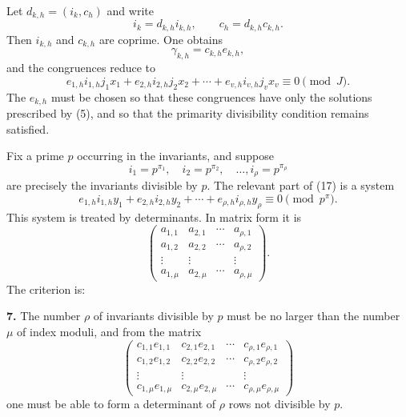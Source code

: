 \documentclass[11pt]{article}
\begin{document}
Let $d_{k,h}=(i_k,c_h)$ and write
\begin{equation}
 i_k=d_{k,h}i_{k,h},\qquad c_h=d_{k,h}c_{k,h}.
\tag{11}
\end{equation}
Then $i_{k,h}$ and $c_{k,h}$ are coprime. One obtains
\begin{equation}
 \gamma_{k,h}=c_{k,h}e_{k,h},
\tag{15}
\end{equation}
and the congruences reduce to
\begin{equation}
 e_{1,h}i_{1,h}j_1x_1+e_{2,h}i_{2,h}j_2x_2+
\cdots+e_{v,h}i_{v,h}j_vx_v\equiv0\pmod J.
\tag{17}
\end{equation}
The $e_{k,h}$ must be chosen so that these congruences have only the solutions prescribed by (5), and so that the primarity divisibility condition remains satisfied.

Fix a prime $p$ occurring in the invariants, and suppose
\begin{equation}
 i_1=p^{\pi_1},\quad i_2=p^{\pi_2},\quad\ldots,
 i_\rho=p^{\pi_\rho}
\tag{18}
\end{equation}
are precisely the invariants divisible by $p$. The relevant part of (17) is a system
\begin{equation}
 e_{1,h}i_{1,h}y_1+e_{2,h}i_{2,h}y_2+
\cdots+e_{\rho,h}i_{\rho,h}y_\rho\equiv0\pmod {p^\pi}.
\tag{20}
\end{equation}
This system is treated by determinants. In matrix form it is
\begin{equation}
\begin{pmatrix}
 a_{1,1}&a_{2,1}&\cdots&a_{\rho,1}\\
 a_{1,2}&a_{2,2}&\cdots&a_{\rho,2}\\
 \vdots&\vdots&&\vdots\\
 a_{1,\mu}&a_{2,\mu}&\cdots&a_{\rho,\mu}
\end{pmatrix}.
\tag{22}
\end{equation}
The criterion is:

\medskip
\noindent\textbf{7.} The number $\rho$ of invariants divisible by $p$ must be no larger than the number $\mu$ of index moduli, and from the matrix
\begin{equation}
\begin{pmatrix}
 c_{1,1}e_{1,1}&c_{2,1}e_{2,1}&\cdots&c_{\rho,1}e_{\rho,1}\\
 c_{1,2}e_{1,2}&c_{2,2}e_{2,2}&\cdots&c_{\rho,2}e_{\rho,2}\\
 \vdots&\vdots&&\vdots\\
 c_{1,\mu}e_{1,\mu}&c_{2,\mu}e_{2,\mu}&\cdots&c_{\rho,\mu}e_{\rho,\mu}
\end{pmatrix}
\tag{24}
\end{equation}
one must be able to form a determinant of $\rho$ rows not divisible by $p$.
\end{document}
